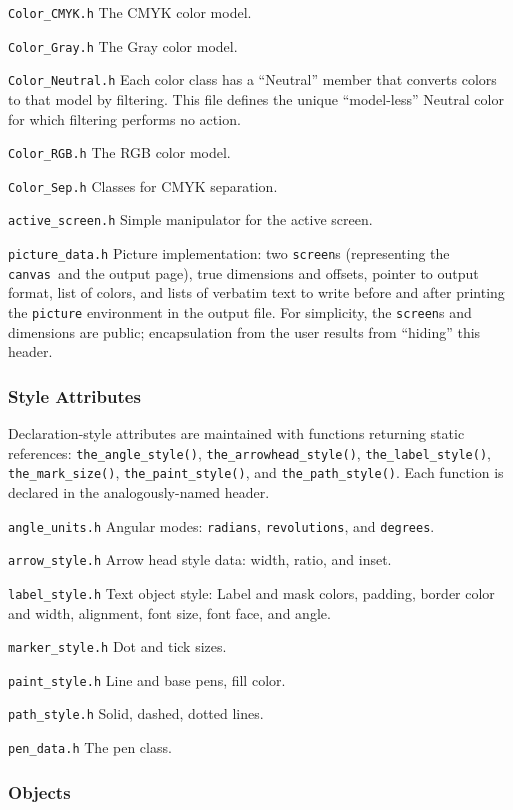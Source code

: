\documentclass[12pt,letterpaper]{book}
\newcommand{\code}[1]{\texttt{#1}}
\newcommand{\Header}[1]{\smallskip\noindent\texttt{#1}\quad}%
\begin{document}
\Header{Color\_CMYK.h} The CMYK color model.

\Header{Color\_Gray.h} The Gray color model.

\Header{Color\_Neutral.h} Each color class has a ``Neutral'' member
that converts colors to that model by filtering. This file defines the
unique ``model-less'' Neutral color for which filtering performs no
action.

\Header{Color\_RGB.h} The RGB color model.

\Header{Color\_Sep.h} Classes for CMYK separation.

\Header{active\_screen.h} Simple manipulator for the active screen.

\Header{picture\_data.h} Picture implementation: two \code{screen}s
(representing the \code{canvas}~and the output page), true dimensions
and offsets, pointer to output format, list of colors, and lists of
verbatim text to write before and after printing the \code{picture}
environment in the output file. For simplicity, the \code{screen}s and
dimensions are public; encapsulation from the user results from
``hiding'' this header.


\subsubsection*{Style Attributes}

Declaration-style attributes are maintained with functions returning
static references: \code{the\_angle\_style()},
\code{the\_arrowhead\_style()}, \code{the\_label\_style()},
\code{the\_mark\_size()}, \code{the\_paint\_style()}, and
\code{the\_path\_style()}. Each function is declared in the
analogously-named header.

\Header{angle\_units.h} Angular modes: \code{radians},
\code{revolutions}, and \code{degrees}.

\Header{arrow\_style.h} Arrow head style data: width, ratio, and
inset.

\Header{label\_style.h} Text object style: Label and mask colors,
padding, border color and width, alignment, font size, font face, and
angle.

\Header{marker\_style.h} Dot and tick sizes.

\Header{paint\_style.h} Line and base pens, fill color.

\Header{path\_style.h} Solid, dashed, dotted lines.

\Header{pen\_data.h} The pen class.


\subsubsection*{Objects}
\end{document}
